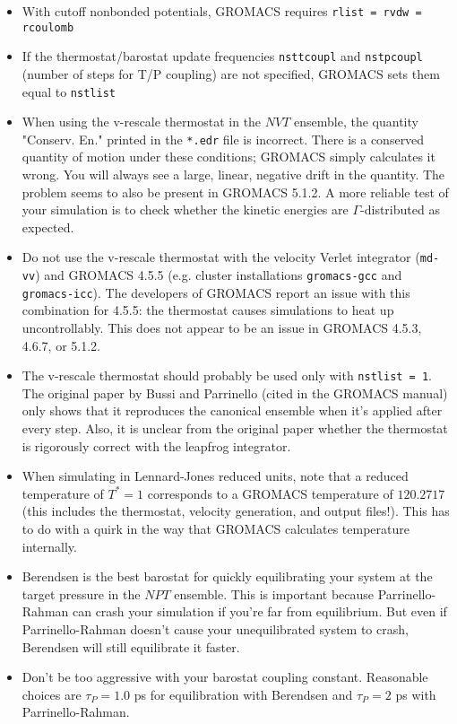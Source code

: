 \documentclass[aip,jmp,superscriptaddress,reprint,onecolumn]{revtex4-1}
\begin{document}
\begin{itemize}
	\item With cutoff nonbonded potentials, GROMACS requires \texttt{rlist = rvdw = rcoulomb}
	\item If the thermostat/barostat update frequencies \texttt{nsttcoupl} and \texttt{nstpcoupl} (number of steps for T/P coupling) are not specified, GROMACS sets them equal to \texttt{nstlist}
	\item When using the v-rescale thermostat in the $NVT$ ensemble, the quantity "Conserv. En." printed in the \texttt{*.edr} file is incorrect. There is a conserved quantity of motion under these conditions; GROMACS simply calculates it wrong. You will always see a large, linear, negative drift in the quantity. The problem seems to also be present in GROMACS 5.1.2. A more reliable test of your simulation is to check whether the kinetic energies are $\Gamma$-distributed as expected.
	\item Do not use the v-rescale thermostat with the velocity Verlet integrator (\texttt{md-vv}) and GROMACS 4.5.5 (e.g. cluster installations \texttt{gromacs-gcc} and \texttt{gromacs-icc}). The developers of GROMACS report an issue with this combination for 4.5.5: the thermostat causes simulations to heat up uncontrollably. This does not appear to be an issue in GROMACS 4.5.3, 4.6.7, or 5.1.2.
	\item The v-rescale thermostat should probably be used only with \texttt{nstlist = 1}. The original paper by Bussi and Parrinello (cited in the GROMACS manual) only shows that it reproduces the canonical ensemble when it's applied after every step. Also, it is unclear from the original paper whether the thermostat is rigorously correct with the leapfrog integrator.
	\item When simulating in Lennard-Jones reduced units, note that a reduced temperature of $T^{*} = 1$ corresponds to a GROMACS temperature of $120.2717$ (this includes the thermostat, velocity generation, and output files!). This has to do with a quirk in the way that GROMACS calculates temperature internally.
	\item Berendsen is the best barostat for quickly equilibrating your system at the target pressure in the $NPT$ ensemble. This is important because Parrinello-Rahman can crash your simulation if you're far from equilibrium. But even if Parrinello-Rahman doesn't cause your unequilibrated system to crash, Berendsen will still equilibrate it faster.
	\item Don't be too aggressive with your barostat coupling constant. Reasonable choices are $\tau_P = 1.0$ ps for equilibration with Berendsen and $\tau_P = 2$ ps with Parrinello-Rahman.
\end{itemize}
\end{document}

